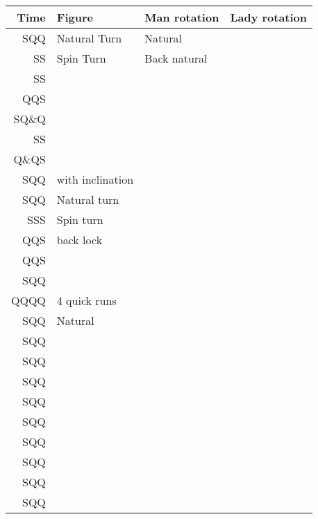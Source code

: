 \documentclass[10pt]{article}
\begin{document}
\begin{tabular}{r l l l}
    \toprule
    Time  & Figure           & Man rotation & Lady rotation \\
    \midrule
    SQQ   & Natural Turn     & Natural      &               \\
    SS    & Spin Turn        & Back natural &               \\
    SS    &                  &              &               \\
    QQS   &                  &              &               \\
    SQ\&Q &                  &              &               \\
    SS    &                  &              &               \\
    Q\&QS &                  &              &               \\
    SQQ   & with inclination &              &               \\
    SQQ   & Natural turn     &              &               \\
    SSS   & Spin turn        &              &               \\
    QQS   & back lock        &              &               \\
    QQS   &                  &              &               \\
    SQQ   &                  &              &               \\
    QQQQ  & 4 quick runs     &              &               \\
    SQQ   & Natural          &              &               \\
    SQQ   &                  &              &               \\
    SQQ   &                  &              &               \\
    SQQ   &                  &              &               \\
    SQQ   &                  &              &               \\
    SQQ   &                  &              &               \\
    SQQ   &                  &              &               \\
    SQQ   &                  &              &               \\
    SQQ   &                  &              &               \\
    SQQ   &                  &              &               \\

\end{tabular}
\end{document}

